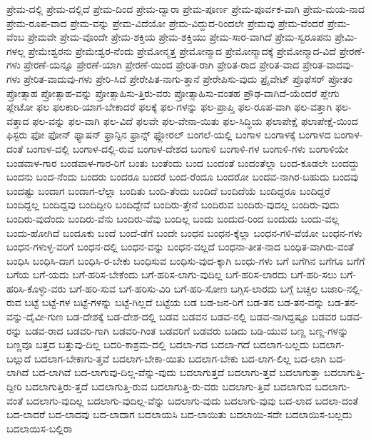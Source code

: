 {ಪ್ರೇಮ-ದಲ್ಲಿ
ಪ್ರೇಮ-ದಲ್ಲಿದೆ
ಪ್ರೇಮ-ದಿಂದ
ಪ್ರೇಮ-ದ್ವಾರಾ
ಪ್ರೇಮ-ಪೂರ್ಣ
ಪ್ರೇಮ-ಪೂರ್ವಕ-ವಾಗಿ
ಪ್ರೇಮ-ಮಯ-ನಾದ
ಪ್ರೇಮ-ರೂಪ-ವಾದ
ಪ್ರೇಮ-ವನ್ನು
ಪ್ರೇಮ-ವಿದೆಯೋ
ಪ್ರೇಮ-ವಿದ್ದುದ-ರಿಂದಲೇ
ಪ್ರೇಮವು
ಪ್ರೇಮ-ವೆಂದರೆ
ಪ್ರೇಮ-ವೆಂಬ
ಪ್ರೇಮವೇ
ಪ್ರೇಮ-ವೊಂದೇ
ಪ್ರೇಮ-ಶಕ್ತಿಯ
ಪ್ರೇಮ-ಶಕ್ತಿಯು
ಪ್ರೇಮ-ಸಾರ-ವಾಗಿದೆ
ಪ್ರೇಮ-ಸ್ವರೂಪನು
ಪ್ರೇಮಿ-ಗಳಲ್ಲ
ಪ್ರೇಮೇಶ್ವರನು
ಪ್ರೇಮೇಶ್ವರ-ನೆಂದು
ಪ್ರೇಮೋನ್ಮತ್ತ
ಪ್ರೇಮೋನ್ಮಾದ
ಪ್ರೇಮೋನ್ಮಾದಕ್ಕೆ
ಪ್ರೇಮೋನ್ಮಾದ-ವಿದೆ
ಪ್ರೇರಣೆ-ಗಳು
ಪ್ರೇರಣೆ-ಯನ್ನೂ
ಪ್ರೇರಣೆ-ಯಾಗಿ
ಪ್ರೇರಣೆ-ಯಿಂದ
ಪ್ರೇರಿತ-ರಾಗಿ
ಪ್ರೇರಿತ-ರಾದ
ಪ್ರೇರಿತ-ವಾದ
ಪ್ರೇರಿತ-ವಾದವು-ಗಳು
ಪ್ರೇರಿತ-ವಾದುವು-ಗಳು
ಪ್ರೇರಿ-ಸಿದೆ
ಪ್ರೇರೇಪಿತ-ನಾಗು-ತ್ತಾನೆ
ಪ್ರೇರೇಪಿಸು-ವುದು
ಪ್ರೈವೇಟ್
ಪ್ರೊಫೆಸರ್
ಪ್ರೋತಂ
ಪ್ರೋತ್ಸಾಹ
ಪ್ರೋತ್ಸಾಹ-ವನ್ನು
ಪ್ರೋತ್ಸಾಹಿಸು-ತ್ತಿರು-ವರು
ಪ್ರೋತ್ಸಾಹಿಸು-ವಂತಹ
ಪ್ರೌಢ-ವಾಗಿದೆ-ಯೆಂದರೆ
ಪ್ಲೇಗು
ಪ್ಲೇಟೋ
ಫಲ
ಫಲಕಾರಿ-ಯಾಗ-ಬೇಕಾದರೆ
ಫಲಕ್ಕೆ
ಫಲ-ಗಳನ್ನು
ಫಲ-ಪ್ರಾಪ್ತಿ
ಫಲ-ರೂಪ-ವಾಗಿ
ಫಲ-ವತ್ತಾಗಿ
ಫಲ-ವತ್ತಾದ
ಫಲ-ವನ್ನು
ಫಲ-ವಾಗಿ
ಫಲ-ವಿದೆ
ಫಲವೇ
ಫಲ-ವೇನಾ-ಯಿತು
ಫಲ-ಸಿದ್ಧಿಯ
ಫಲಾಪೇಕ್ಷೆ
ಫಲಾಪೇಕ್ಷೆ-ಯಿಂದ
ಫಿಸ್ಟರು
ಫೋ
ಫೋನ್
ಫ್ಯಾಷನ್
ಫ್ರಾನ್ಸಿನ
ಫ್ರಾನ್ಸ್
ಫ್ಲೋರಲ್
ಬಂಗಲೆ-ಯಲ್ಲಿ
ಬಂಗಾಳ
ಬಂಗಾಳಕ್ಕೆ
ಬಂಗಾಳದ
ಬಂಗಾಳ-ದಂತೆ
ಬಂಗಾಳ-ದಲ್ಲಿ
ಬಂಗಾಳ-ದಲ್ಲಿ-ರುವ
ಬಂಗಾಳ-ದೇಶದ
ಬಂಗಾಳಿ
ಬಂಗಾಳಿ-ಗಳ
ಬಂಗಾಳಿ-ಗಳು
ಬಂಗಾಳಿಯೇ
ಬಂಡವಾಳ-ಗಾರ
ಬಂಡವಾಳ-ಗಾರ-ರಿಗೆ
ಬಂತು
ಬಂತೆಂದು
ಬಂದ
ಬಂದಂತೆ
ಬಂದಂತೆಲ್ಲಾ
ಬಂದ-ಕೂಡಲೇ
ಬಂದದ್ದು
ಬಂದನು
ಬಂದ-ನೆಂದು
ಬಂದರು
ಬಂದರೂ
ಬಂದರೆ
ಬಂದ-ರೆಂದೂ
ಬಂದರೋ
ಬಂದವ-ನಾಗಿರ-ಬಹುದು
ಬಂದವು
ಬಂದಷ್ಟು
ಬಂದಾಗ
ಬಂದಾಗ-ಲೆಲ್ಲಾ
ಬಂದಿತು
ಬಂದಿ-ತೆಂದು
ಬಂದಿದೆ
ಬಂದಿದೆಯೆ
ಬಂದಿದ್ದರೂ
ಬಂದಿದ್ದರೆ
ಬಂದಿದ್ದಲ್ಲ
ಬಂದಿದ್ದವು
ಬಂದಿದ್ದೀರಿ
ಬಂದಿದ್ದೇವೆ
ಬಂದಿರು-ತ್ತೇನೆ
ಬಂದಿರುವ
ಬಂದಿರು-ವುದಲ್ಲ
ಬಂದಿರು-ವುದು
ಬಂದಿರು-ವುದೆಂದು
ಬಂದಿರು-ವೆನು
ಬಂದಿರು-ವೆವು
ಬಂದಿಲ್ಲ
ಬಂದು
ಬಂದುದ-ರಿಂದ
ಬಂದುದು
ಬಂದು-ವಲ್ಲ
ಬಂದು-ಹೋಗಿದೆ
ಬಂದೂಕು
ಬಂದೆ
ಬಂದೆ-ಡೆಗೆ
ಬಂದೇ
ಬಂಧನ
ಬಂಧನ-ಕ್ಕೆಲ್ಲಾ
ಬಂಧನ-ಗಳಿ-ವೆಯೋ
ಬಂಧನ-ಗಳು
ಬಂಧನ-ಗಳುಳ್ಳ-ವರಿಗೆ
ಬಂಧನ-ದಲ್ಲಿ
ಬಂಧನ-ವನ್ನು
ಬಂಧನ-ವಲ್ಲದೆ
ಬಂಧನಾ-ತೀತ-ನಾದ
ಬಂಧಿತ-ವಾಗಿರು-ವಂತೆ
ಬಂಧಿಸಿ
ಬಂಧಿಸಿ-ದಾಗ
ಬಂಧಿಸಿ-ರ-ಬೇಕು
ಬಂಧಿಸುವ
ಬಂಧಿಸು-ವುದ-ಕ್ಕಾಗಿ
ಬಂಧು-ಗಳು
ಬಗೆ
ಬಗೆಗಿನ
ಬಗೆಗೂ
ಬಗೆಗೆ
ಬಗೆಯ
ಬಗೆ-ಯದು
ಬಗೆ-ಹರಿಸ-ಬೇಕೆಂದು
ಬಗೆ-ಹರಿಸ-ಲಾಗು-ವುದಿಲ್ಲ
ಬಗೆ-ಹರಿಸ-ಲಾರದು
ಬಗೆ-ಹರಿ-ಸಲು
ಬಗೆ-ಹರಿಸಿ-ಕೊಳ್ಳು-ವರು
ಬಗೆ-ಹರಿ-ಸುವ
ಬಗೆ-ಹರಿಸು-ವಿರಿ
ಬಗೆ-ಹರಿ-ಸೋಣ
ಬಗ್ಗಿಸ-ಲಾರದು
ಬಗ್ಗೆ
ಬಚ್ಚಲ
ಬಜಾರಿ-ನಲ್ಲಿ-ರುವ
ಬಟ್ಟೆ
ಬಟ್ಟೆ-ಗಳ
ಬಟ್ಟೆ-ಗಳನ್ನು
ಬಟ್ಟೆ-ಗಿಲ್ಲದೆ
ಬಟ್ಟೆಯ
ಬಡ
ಬಡ-ಜನ-ರಿಗೆ
ಬಡ-ತನ
ಬಡ-ತನ-ವನ್ನು
ಬಡ-ತನ-ವನ್ನು-ದೈವೀ-ಗುಣ
ಬಡ-ದೇಶಕ್ಕೆ
ಬಡ-ದೇಶ-ದಲ್ಲಿ
ಬಡವ
ಬಡವನ
ಬಡವ-ನಲ್ಲಿ
ಬಡವ-ನಾಗಿದ್ದಷ್ಟೂ
ಬಡವರ
ಬಡವ-ರನ್ನು
ಬಡವ-ರಾದ
ಬಡವರಿ-ಗಾಗಿ
ಬಡವರಿ-ಗಿಂತ
ಬಡವರಿಗೆ
ಬಡವರು
ಬಡಿದು
ಬಡಿ-ಯುವ
ಬಣ್ಣ
ಬಣ್ಣ-ಗಳನ್ನು
ಬಣ್ಣವೂ
ಬತ್ತದ
ಬತ್ತುವು-ದಿಲ್ಲ
ಬದರಿ-ಕಾಶ್ರಮ-ದಲ್ಲಿ
ಬದಲಾ-ಗದ
ಬದಲಾ-ಗದೆ
ಬದಲಾಗ-ಬಲ್ಲದು
ಬದಲಾಗ-ಬಲ್ಲುದೆ
ಬದಲಾಗ-ಬೇಕಾಗು-ತ್ತವೆ
ಬದಲಾಗ-ಬೇಕಾ-ಯಿತು
ಬದಲಾಗ-ಬೇಕು
ಬದ-ಲಾಗ-ಲಿಲ್ಲ
ಬದ-ಲಾಗಿ
ಬದ-ಲಾಗಿದೆ
ಬದ-ಲಾಗಿವೆ
ಬದ-ಲಾಗುವು-ದಿಲ್ಲ-ವೆನ್ನು-ವುದು
ಬದಲಾಗುತ್ತದೆ
ಬದಲಾಗು-ತ್ತವೆ
ಬದಲಾಗುತ್ತಾ
ಬದಲಾಗುತ್ತಿ-ದ್ದೀರಿ
ಬದಲಾಗುತ್ತಿರು-ತ್ತದೆ
ಬದಲಾಗುತ್ತಿ-ರುವ
ಬದಲಾಗುತ್ತಿ-ರು-ವರು
ಬದಲಾಗು-ತ್ತಿವೆ
ಬದಲಾಗುವ
ಬದಲಾಗು-ವಂತೆ
ಬದಲಾಗು-ವುದಿಲ್ಲ
ಬದಲಾಗು-ವುದಿಲ್ಲ-ವೆನ್ನು
ಬದಲಾಗು-ವುದು
ಬದಲಾಗು-ವುವು
ಬದ-ಲಾದ
ಬದಲಾ-ದಂತೆ
ಬದ-ಲಾದರೆ
ಬದ-ಲಾದವು
ಬದ-ಲಾದಾಗ
ಬದಲಾಯಸಿ
ಬದ-ಲಾಯಿತು
ಬದಲಾಯಿ-ಸದೇ
ಬದಲಾಯಿಸ-ಬಲ್ಲದು
ಬದಲಾಯಿಸ-ಬಲ್ಲಿರಾ
}
